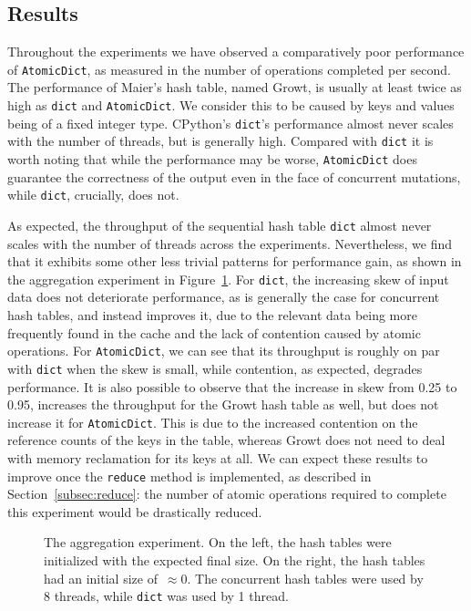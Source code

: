 \subsection{Results}\label{subsec:comparisons-results}

Throughout the experiments we have observed a comparatively poor performance of \texttt{AtomicDict}, as measured in the number of operations completed per second.
The performance of Maier's hash table, named Growt, is usually at least twice as high as \texttt{dict} and \texttt{AtomicDict}.
We consider this to be caused by keys and values being of a fixed integer type.
CPython's \texttt{dict}'s performance almost never scales with the number of threads, but is generally high.
Compared with \texttt{dict} it is worth noting that while the performance may be worse, \texttt{AtomicDict} does guarantee the correctness of the output even in the face of concurrent mutations, while \texttt{dict}, crucially, does not.

As expected, the throughput of the sequential hash table \texttt{dict} almost never scales with the number of threads across the experiments.
Nevertheless, we find that it exhibits some other less trivial patterns for performance gain, as shown in the aggregation experiment in Figure~\ref{fig:aggregation}.
For \texttt{dict}, the increasing skew of input data does not deteriorate performance, as is generally the case for concurrent hash tables, and instead improves it, due to the relevant data being more frequently found in the cache and the lack of contention caused by atomic operations.
For \texttt{AtomicDict}, we can see that its throughput is roughly on par with \texttt{dict} when the skew is small, while contention, as expected, degrades performance.
It is also possible to observe that the increase in skew from 0.25 to 0.95, increases the throughput for the Growt hash table as well, but does not increase it for \texttt{AtomicDict}.
This is due to the increased contention on the reference counts of the keys in the table, whereas Growt does not need to deal with memory reclamation for its keys at all.
We can expect these results to improve once the \texttt{reduce} method is implemented, as described in Section~\ref{subsec:reduce}: the number of atomic operations required to complete this experiment would be drastically reduced.

\begin{figure}
    \begin{centering}
        \scalebox{0.4}{}%
        \scalebox{0.4}{}
        \caption{The aggregation experiment. On the left, the hash tables were initialized with the expected final size. On the right, the hash tables had an initial size of~$\approx$0. The concurrent hash tables were used by 8 threads, while \texttt{dict} was used by 1 thread.}
        \label{fig:aggregation}
    \end{centering}
\end{figure}


